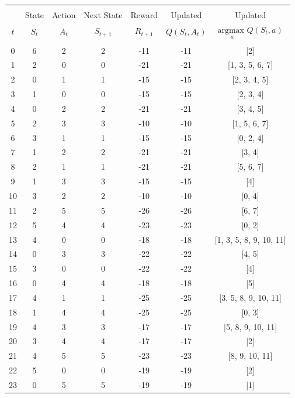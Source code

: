 \begin{table}[!htbp]
\small
\begin{adjustbox}{totalheight = \baselineskip, center}
\begin{tabular}{@{\extracolsep{5pt}} ccccccc} 
\\[-1.8ex]\hline 
\hline \\[-1.8ex]
& State & Action & Next State & Reward & Updated & Updated \\
$t$ & $S_t$ & $A_t$ & $S_{t+1}$ & $R_{t+1}$ & $Q(S_t, A_t)$ & $\underset{a}{\text{argmax }} Q(S_t, a)$\\[1ex] 
\hline \\[-1.8ex] 
0 & 6 & 2 & 2 & -11 & -11 & [2] \\
1 & 2 & 0 & 0 & -21 & -21 & [1, 3, 5, 6, 7] \\
2 & 0 & 1 & 1 & -15 & -15 & [2, 3, 4, 5] \\
3 & 1 & 0 & 0 & -15 & -15 & [2, 3, 4] \\
4 & 0 & 2 & 2 & -21 & -21 & [3, 4, 5] \\
5 & 2 & 3 & 3 & -10 & -10 & [1, 5, 6, 7] \\
6 & 3 & 1 & 1 & -15 & -15 & [0, 2, 4] \\
7 & 1 & 2 & 2 & -21 & -21 & [3, 4] \\
8 & 2 & 1 & 1 & -21 & -21 & [5, 6, 7] \\
9 & 1 & 3 & 3 & -15 & -15 & [4] \\
10 & 3 & 2 & 2 & -10 & -10 & [0, 4] \\
11 & 2 & 5 & 5 & -26 & -26 & [6, 7] \\
12 & 5 & 4 & 4 & -23 & -23 & [0, 2] \\
13 & 4 & 0 & 0 & -18 & -18 & [1, 3, 5, 8, 9, 10, 11] \\
14 & 0 & 3 & 3 & -22 & -22 & [4, 5] \\
15 & 3 & 0 & 0 & -22 & -22 & [4] \\
16 & 0 & 4 & 4 & -18 & -18 & [5]  \\
17 & 4 & 1 & 1 & -25 & -25 & [3, 5, 8, 9, 10, 11] \\
18 & 1 & 4 & 4 & -25 & -25 & [0, 3]  \\
19 & 4 & 3 & 3 & -17 & -17 & [5, 8, 9, 10, 11] \\
20 & 3 & 4 & 4 & -17 & -17 & [2] \\
21 & 4 & 5 & 5 & -23 & -23 & [8, 9, 10, 11]  \\
22 & 5 & 0 & 0 & -19 & -19 & [2] \\
23 & 0 & 5 & 5 & -19 & -19 & [1] \\

\end{tabular}
\end{adjustbox}
\end{table}
